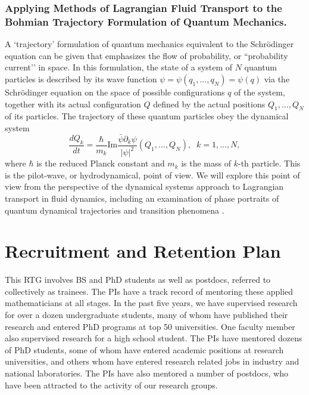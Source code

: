 \documentclass[11pt]{NSFamsart}
\begin{document}
\subsubsection*{Applying Methods of Lagrangian Fluid Transport to the Bohmian Trajectory Formulation of Quantum Mechanics.}   A `trajectory'  formulation of quantum mechanics  equivalent to the Schr\"{o}dinger equation can be given \cite{Bohmian, Holland1993TheQT} that emphasizes the flow of probability, or ``probability current’’ in space. 
In this formulation, the state of a system of $N$ quantum particles is described by its wave function $\psi=\psi(q_1,…,q_N)=\psi(q)$ via the Schr\"{o}dinger equation  on the space of possible configurations $q$ of the system, together with its actual configuration $Q$ defined by the actual positions $Q_1,...,Q_N$ of its particles. The trajectory of these quantum particles obey the dynamical system
$$
\frac{dQ_k}{dt}= \frac{\hbar}{m_k} \text{Im} \frac{\bar\psi  \partial_k \psi}{|\psi|^2}(Q_1,…,Q_N),\;\; k=1, ..., N,  $$
where $\hbar$ is the reduced Planck constant and $m_k$ is the mass of $k$-th particle.
This is the pilot-wave, or hydrodynamical, point of view. We will explore this point of view from the perspective of the dynamical systems approach to Lagrangian transport in fluid dynamics, including an examination of phase portraits of quantum dynamical trajectories \cite{Berndl1995OnTG} and transition phenomena \cite{waalkens2007wigner,Micha2006QuantumDW, Dittrich2016}. 


\section{Recruitment and Retention Plan} \label{sec:RandR}
This RTG involves BS and PhD students as well as postdocs, referred to collectively as trainees.  The PIs have a track record of mentoring these applied mathematicians at all stages.  In the past five years, we have supervised research for over a dozen undergraduate students, many of whom have published their research and entered PhD programs at top 50 universities. One faculty member also supervised research for a high school student.  The PIs have  mentored dozens of PhD students, some of whom have entered academic positions at research universities, and others whom have entered research related jobs in industry and national laboratories.  The PIs have also mentored a number of postdocs, who have been attracted to the activity of our research groups.
\end{document}
